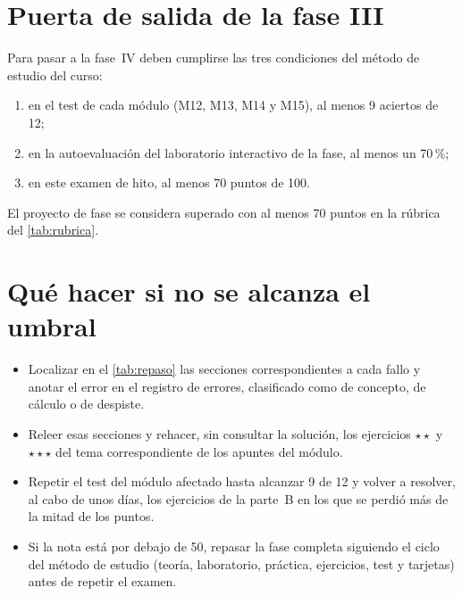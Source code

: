 \section{Puerta de salida de la fase III}

Para pasar a la fase~IV deben cumplirse las tres condiciones del método de estudio del curso:
\begin{enumerate}[label=\arabic*.]
  \item en el test de cada módulo (M12, M13, M14 y M15), al menos 9 aciertos de 12;
  \item en la autoevaluación del laboratorio interactivo de la fase, al menos un 70\,\%;
  \item en este examen de hito, al menos 70 puntos de 100.
\end{enumerate}
El proyecto de fase se considera superado con al menos 70 puntos en la rúbrica del \cref{tab:rubrica}.

\section{Qué hacer si no se alcanza el umbral}

\begin{itemize}[leftmargin=1.4em,label=\textendash]
  \item Localizar en el \cref{tab:repaso} las secciones correspondientes a cada fallo y anotar el error en el registro de errores, clasificado como de concepto, de cálculo o de despiste.
  \item Releer esas secciones y rehacer, sin consultar la solución, los ejercicios $\star\star$ y $\star\star\star$ del tema correspondiente de los apuntes del módulo.
  \item Repetir el test del módulo afectado hasta alcanzar 9 de 12 y volver a resolver, al cabo de unos días, los ejercicios de la parte~B en los que se perdió más de la mitad de los puntos.
  \item Si la nota está por debajo de 50, repasar la fase completa siguiendo el ciclo del método de estudio (teoría, laboratorio, práctica, ejercicios, test y tarjetas) antes de repetir el examen.
\end{itemize}

